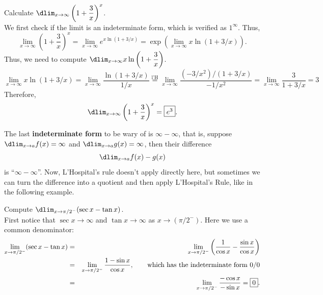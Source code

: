 \documentclass{book}
\newcommand{\lHeq}{\overset{\text{l'H}}{=}}
\begin{document}
\begin{Exam} Calculate $\dlim_{x\to \infty} \left(1+\dfrac{3}{x}\right)^x$.\\

We first check if the limit is an indeterminate form, which is verified as $1^\infty$. Thus,
\[ \lim_{x\to \infty} \left(1+\dfrac{3}{x}\right)^x = \lim_{x\to \infty} e^{x\ln(1+3/x)} = \exp\left(\lim_{x\to \infty} x\ln (1+3/x)\right).\] Thus, we need to compute $\dlim_{x\to \infty} x\ln\left(1+\dfrac{3}{x}\right)$.
\[\lim_{x\to \infty} x \ln(1+3/x) = \lim_{x\to \infty} \dfrac{\ln (1+3/x)}{1/x}
\lHeq \lim_{x\to \infty} \dfrac{(-3/x^2)/(1+3/x)}{-1/x^2} 
= \lim_{x\to \infty} \dfrac{3}{1+3/x} = 3\]
Therefore, \[\dlim_{x\to \infty} \left(1+\dfrac{3}{x}\right)^x = \fbox{$e^3$}. \]
\end{Exam}\vs

The last \textbf{indeterminate form} to be wary of is $\infty - \infty$, that is, suppose $\dlim_{x\to a} f(x) = \infty$ and $\dlim_{x\to a} g(x) = \infty$, then their difference \[\dlim_{x\to a} f(x) - g(x)\] is ``$\infty -\infty$''. Now, L'Hospital's rule doesn't apply directly here, but sometimes we can turn the difference into a quotient and then apply L'Hospital's Rule, like in the following example.
\begin{Exam}
Compute $\dlim_{x\to \pi/2^-} (\sec x - \tan x)$.\\

First notice that $\sec x \to \infty$ and $\tan x \to \infty$ as $x\to (\pi/2^-)$. Here we use a common denominator:
\begin{eqnarray*}
\lim_{x\to \pi/2^-} (\sec x - \tan x) &=& \lim_{x\to \pi/2^-} \left(\dfrac{1}{\cos x} - \dfrac{\sin x}{\cos x}\right)\\
&=& \lim_{x\to \pi/2^-} \dfrac{1-\sin x}{\cos x},\qquad\mbox{which has the indeterminate form $0/0$}\\
& =& \lim_{x\to \pi/2^-} \dfrac{-\cos x}{-\sin x} = \fbox{$0$}.
\end{eqnarray*}
\end{Exam}

\vfill
{}
\pagebreak
\end{document}
